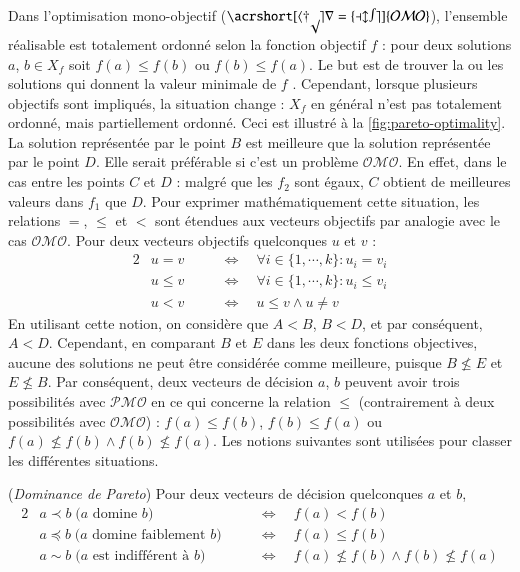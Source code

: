 Dans l'optimisation mono-objectif ($\mathcal{\acrshort[hyper=false]{OMO}}$), l'ensemble réalisable est totalement ordonné selon la fonction objectif $f$ : pour deux solutions $a$, $b \in X_f$ soit $f(a) \leqslant f(b)$ ou $f(b) \leqslant f(a)$. Le but est de trouver la ou les solutions qui donnent la valeur minimale de $f$ \cite{Deb01}. Cependant, lorsque plusieurs objectifs sont impliqués, la situation change : $X_f$ en général n'est pas totalement ordonné, mais partiellement ordonné. Ceci est illustré à la \ref{fig:pareto-optimality}. La solution représentée par le point $B$ est meilleure que la solution représentée par le point $D$. Elle serait préférable si c'est un problème $\mathcal{OMO}$. En effet, dans le cas entre les points $C$ et $D$ : malgré que les $f_2$ sont égaux, $C$ obtient de meilleures valeurs dans $f_1$ que $D$. Pour exprimer mathématiquement cette situation, les relations $=$, $\leqslant$ et $<$ sont étendues aux vecteurs objectifs par analogie avec le cas $\mathcal{OMO}$. Pour deux vecteurs objectifs quelconques $u$ et $v$ :
\begin{alignat}{2}
& u = v         \quad && \Leftrightarrow \quad \forall i \in \{1,\cdots,k\} : u_i = v_i \nonumber \\
& u \leqslant v \quad && \Leftrightarrow \quad \forall i \in \{1,\cdots,k\} : u_i \leqslant v_i \nonumber \\
& u < v         \quad && \Leftrightarrow \quad u \leqslant v \wedge u \neq v 
\end{alignat}
En utilisant cette notion, on considère que $A < B$, $B < D$, et par conséquent, $A < D$. Cependant, en comparant $B$ et $E$ dans les deux fonctions objectives, aucune des solutions ne peut être considérée comme meilleure, puisque $B \nleqslant E$ et $E \nleqslant B$. Par conséquent, deux vecteurs de décision $a$, $b$ peuvent avoir trois possibilités avec $\mathcal{PMO}$ en ce qui concerne la relation $\leqslant$ (contrairement à deux possibilités avec $\mathcal{OMO}$) : $f(a) \leqslant f(b)$, $f(b) \leqslant f(a)$ ou $f(a) \nleqslant f(b) \wedge f(b) \nleqslant f(a)$. Les notions suivantes sont utilisées pour classer les différentes situations.
\begin{definition}
 (\textit{Dominance de Pareto}) Pour deux vecteurs de décision quelconques $a$ et $b$,
 \begin{alignat}{2}
  & a \prec b        \; \text{($a$ domine $b$)}          \quad && \Leftrightarrow \quad f(a) < f(b) \nonumber \\
  & a \preccurlyeq b \; \text{($a$ domine faiblement $b$)} \quad && \Leftrightarrow \quad f(a) \leqslant f(b) \nonumber \\
  & a \sim b         \; \text{($a$ est indifférent à $b$)} \quad && \Leftrightarrow \quad f(a) \nleqslant f(b) \wedge f(b) \nleqslant f(a) 
  \end{alignat}
\end{definition}

